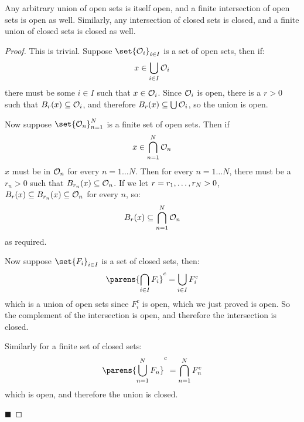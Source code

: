 \documentclass[10pt]{article}
\def\openset{{\cal O}}
\begin{document}


\bigskip


\begin{prop*}

    Any arbitrary union of open sets is itself open, and a finite intersection of open sets is open as well.
    Similarly, any intersection of closed sets is closed, and a finite union of closed sets is closed as well.

\end{prop*}

\begin{proof}

    This is trivial.
    Suppose $\set{\openset_i}_{i\in I}$ is a set of open sets, then if:
    \[ x\in\bigcup_{i\in I}\openset_i \]
    there must be some $i\in I$ such that $x\in\openset_i$.
    Since $\openset_i$ is open, there is a $r>0$ such that $B_r(x)\subseteq\openset_i$, and therefore $B_r(x)\subseteq\bigcup\openset_i$, so the union is open.

    Now suppose $\set{\openset_n}_{n=1}^N$ is a finite set of open sets.
    Then if
    \[ x\in\bigcap_{n=1}^N \openset_n \]
    $x$ must be in $\openset_n$ for every $n=1\dots N$.
    Then for every $n=1\dots N$, there must be a $r_n>0$ such that $B_{r_n}(x)\subseteq\openset_n$.
    If we let $r=\minof{r_1,\dots,r_N}>0$, $B_r(x)\subseteq B_{r_n}(x)\subseteq\openset_n$ for every $n$, so:
    \[ B_r(x)\subseteq\bigcap_{n=1}^N\openset_n \]
    as required.

    Now suppose $\set{F_i}_{i\in I}$ is a set of closed sets, then:
    \[ \parens{\bigcap_{i\in I} F_i}^c = \bigcup_{i\in I} F_i^c \]
    which is a union of open sets since $F_i^c$ is open, which we just proved is open.
    So the complement of the intersection is open, and therefore the intersection is closed.

    Similarly for a finite set of closed sets:
    \[ \parens{\bigcup_{n=1}^N F_n}^c = \bigcap_{n=1}^N F_n^c \]
    which is open, and therefore the union is closed.

    \hfill$\blacksquare$

\end{proof}
\end{document}

